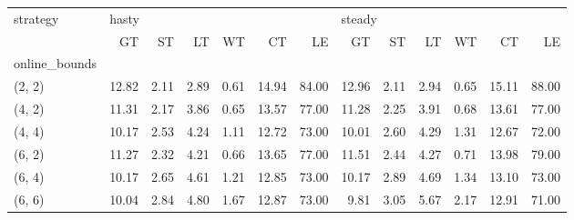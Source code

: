\begin{tabular}{lrrrrrrrrrrrr}
\toprule
strategy & \multicolumn{6}{l}{hasty} & \multicolumn{6}{l}{steady} \\
{} &    GT &   ST &   LT &   WT &    CT &    LE &     GT &   ST &   LT &   WT &    CT &    LE \\
online\_bounds &       &      &      &      &       &       &        &      &      &      &       &       \\
\midrule
(2, 2)        & 12.82 & 2.11 & 2.89 & 0.61 & 14.94 & 84.00 &  12.96 & 2.11 & 2.94 & 0.65 & 15.11 & 88.00 \\
(4, 2)        & 11.31 & 2.17 & 3.86 & 0.65 & 13.57 & 77.00 &  11.28 & 2.25 & 3.91 & 0.68 & 13.61 & 77.00 \\
(4, 4)        & 10.17 & 2.53 & 4.24 & 1.11 & 12.72 & 73.00 &  10.01 & 2.60 & 4.29 & 1.31 & 12.67 & 72.00 \\
(6, 2)        & 11.27 & 2.32 & 4.21 & 0.66 & 13.65 & 77.00 &  11.51 & 2.44 & 4.27 & 0.71 & 13.98 & 79.00 \\
(6, 4)        & 10.17 & 2.65 & 4.61 & 1.21 & 12.85 & 73.00 &  10.17 & 2.89 & 4.69 & 1.34 & 13.10 & 73.00 \\
(6, 6)        & 10.04 & 2.84 & 4.80 & 1.67 & 12.87 & 73.00 &   9.81 & 3.05 & 5.67 & 2.17 & 12.91 & 71.00 \\
\bottomrule
\end{tabular}
